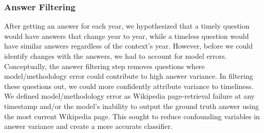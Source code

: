 \documentclass{article}
\begin{document}
\subsubsection{Answer Filtering}


After getting an answer for each year, we hypothesized that a timely question
would have answers that change year to year, while a timeless question would
have similar answers regardless of the context's year. However, before we could
identify changes with the answers, we had to account for model errors.
Conceptually, the answer filtering step removes questions where
model/methodology error could contribute to high answer variance. In filtering
these questions out, we could more confidently attribute variance to timeliness.
We defined model/methodology error as Wikipedia page-retrieval failure at any
timestamp and/or the model's inability to output the ground truth answer using
the most current Wikipedia page. This sought to reduce confounding variables in
answer variance and create a more accurate classifier.
\end{document}
